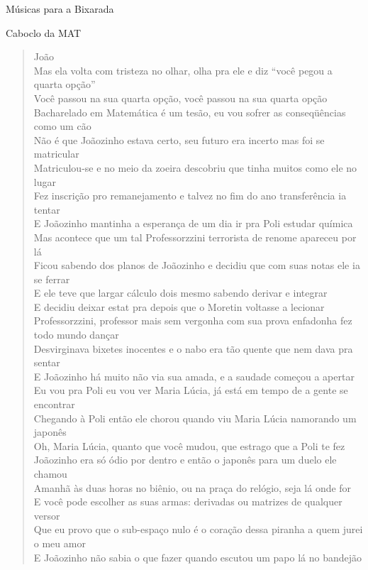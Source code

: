 \begin{secao}{Músicas para a Bixarada}
\begin{subsecao}{Caboclo da MAT}
\begin{verse}
João\\
Mas ela volta com tristeza no olhar, olha pra ele e diz ``você pegou a quarta
opção''\\
Você passou na sua quarta opção, você passou na sua quarta opção\\
Bacharelado em Matemática é um tesão, eu vou sofrer as conseqüências como um cão\\
Não é que Joãozinho estava certo, seu futuro era incerto mas foi se matricular\\
Matriculou-se e no meio da zoeira descobriu que tinha muitos como ele no lugar\\
Fez inscrição pro remanejamento e talvez no fim do ano transferência ia tentar\\
E Joãozinho mantinha a esperança de um dia ir pra Poli estudar química\\
Mas acontece que um tal Professorzzini terrorista de renome apareceu por lá\\
Ficou sabendo dos planos de Joãozinho e decidiu que com suas notas ele ia se
ferrar\\
E ele teve que largar cálculo dois mesmo sabendo derivar e integrar\\
E decidiu deixar estat pra depois que o Moretin voltasse a lecionar\\
Professorzzini, professor mais sem vergonha com sua prova enfadonha fez todo
mundo dançar\\
Desvirginava bixetes inocentes e o nabo era tão quente que nem dava pra sentar\\
E Joãozinho há muito não via sua amada, e a saudade começou a apertar\\
Eu vou pra Poli eu vou ver Maria Lúcia, já está em tempo de a gente se encontrar\\
Chegando à Poli então ele chorou quando viu Maria Lúcia namorando um japonês\\
Oh, Maria Lúcia, quanto que você mudou, que estrago que a Poli te fez\\
Joãozinho era só ódio por dentro e então o japonês para um duelo ele chamou\\
Amanhã às duas horas no biênio, ou na praça do relógio, seja lá onde for\\
E você pode escolher as suas armas: derivadas ou matrizes de qualquer versor\\
Que eu provo que o sub-espaço nulo é o coração dessa piranha a quem jurei o meu
amor\\
E Joãozinho não sabia o que fazer quando escutou um papo lá no bandejão\\

\end{verse}
\end{subsecao}
\end{secao}
